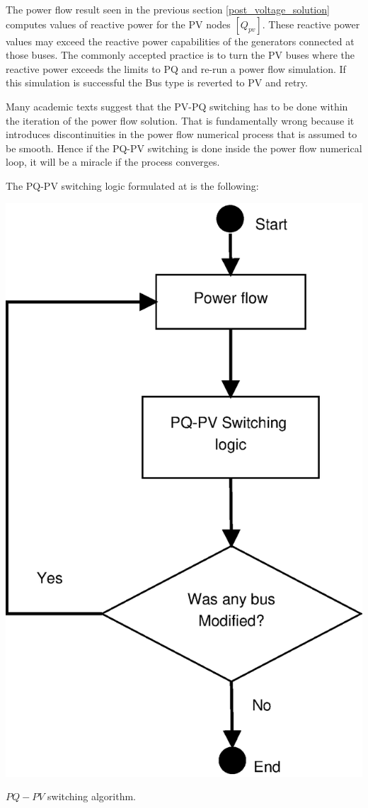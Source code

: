 \documentclass[nols,a4paper,twoside,symmetric,notoc,fleqn]{tufte-book}
\begin{document}
The power flow result seen in the previous section \ref{post_voltage_solution} computes values of reactive power for the PV nodes $[Q_{pv}]$. These reactive power values may exceed the reactive power capabilities of the generators connected at those buses. The commonly accepted practice is to turn the PV buses where the reactive power exceeds the limits to PQ and re-run a power flow simulation. If this simulation is successful the Bus type is reverted to PV and retry.

Many academic texts suggest that the PV-PQ switching has to be done within the iteration of the power flow solution. That is fundamentally wrong because it introduces discontinuities in the power flow numerical process that is assumed to be smooth. Hence if the PQ-PV switching is done inside the power flow numerical loop, it will be a miracle if the process converges.


The PQ-PV switching logic formulated at \cite{zhao2008pv} is the following:

\begin{marginfigure}
	\includegraphics[width=0.9\linewidth]{img/PQ_PV_switching.eps}
	\caption{$PQ-PV$ switching algorithm.}
	\label{pq_pv_switching}
\end{marginfigure}
\end{document}
